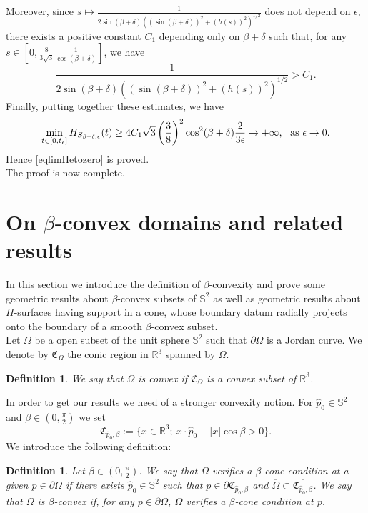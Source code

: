 \documentclass[a4paper,reqno,10pt,oneside]{amsart}
\numberwithin{equation}{section}
\newtheorem{definition}[theorem]{Definition}
\begin{document}
Moreover, since $s \mapsto\frac{1}{2\sin(\beta+\delta)  \left((\sin(\beta+\delta))^2 + (h(s))^2\right)^{1/2}}$  does not depend on ${\epsilon}$, there exists a positive constant $C_1$ depending only on $\beta+\delta$ such that, for any $s \in \left[0, \frac{8}{3\sqrt{3}}\frac{1}{\cos(\beta+\delta)}\right]$, we have 
$$ \frac{1}{2\sin(\beta+\delta)  \left((\sin(\beta+\delta))^2 + (h(s))^2\right)^{1/2}}>C_1. $$
Finally, putting together these estimates, we have $$ \min_{t \in [0,t_{\epsilon}]}H_{S_{\beta + \delta,\epsilon}}(t) \geq 4C_1\sqrt{3} \left(\frac{3}{8}\right)^2 \cos^2(\beta+\delta)\frac{2}{3{\epsilon}} \to + \infty, \ \ \hbox{as} \ {\epsilon}\to 0.$$
Hence \eqref{eqlimHetozero} is proved.\\
 
The proof is now complete.

\section{On $\beta$-convex domains and related results}
In this section we introduce the definition of $\beta$-convexity and prove some geometric results about $\beta$-convex subsets of $\mathbb{S}^2$ as well as geometric results about $H$-surfaces having support in a cone, whose boundary datum radially projects onto the boundary of a smooth $\beta$-convex subset.\\

Let $\Omega$ be a open subset of the unit sphere $\mathbb{S}^2$ such that $\partial \Omega$ is a Jordan curve.
We denote by $\mathfrak{C}_\Omega$ the conic region in ${\mathbb R}^3$ spanned by $\Omega$. 
\begin{definition}
We say that $\Omega$ is convex if $\mathfrak{C}_\Omega$ is a convex subset of ${\mathbb R}^3$.
\end{definition}
 

In order to get our results we need of a stronger convexity notion. For $\hat p_0 \in \mathbb{S}^2$ and $\beta \in (0,\frac{\pi}{2})$ we set 
$$\mathfrak{C}_{\hat p_0, \beta}:=\{x \in {\mathbb R}^3; \ x\cdot \hat p_0 - |x| \cos \beta >0\}.$$ We introduce the following definition:

\begin{definition}\label{defbetaconvx}
 Let $\beta \in (0,\frac{\pi}{2})$. We say that $\Omega$ verifies a $\beta$-cone condition at a given $p \in \partial \Omega$ if there exists $\hat p_0 \in \mathbb{S}^2$ such that $p \in \partial {\mathfrak{C}_{\hat p_0, \beta}}$ and $\overline\Omega \subset \overline{\mathfrak{C}_{\hat p_0, \beta}}$. We say that $\Omega$ is $\beta$-convex if, for any $p \in \partial \Omega$, $\Omega$ verifies a $\beta$-cone condition at $p$.
 \end{definition}
\end{document}
